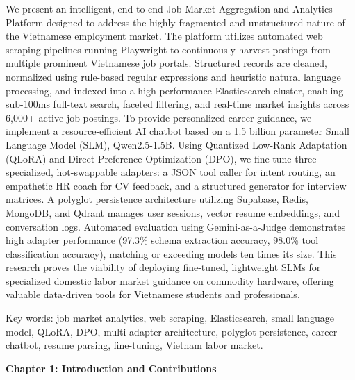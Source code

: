 \documentclass[12pt, a4paper]{report}
\begin{document}
\noindent We present an intelligent, end-to-end Job Market Aggregation and Analytics Platform designed to address the highly fragmented and unstructured nature of the Vietnamese employment market. The platform utilizes automated web scraping pipelines running Playwright to continuously harvest postings from multiple prominent Vietnamese job portals. Structured records are cleaned, normalized using rule-based regular expressions and heuristic natural language processing, and indexed into a high-performance Elasticsearch cluster, enabling sub-100ms full-text search, faceted filtering, and real-time market insights across 6,000+ active job postings. To provide personalized career guidance, we implement a resource-efficient AI chatbot based on a 1.5 billion parameter Small Language Model (SLM), Qwen2.5-1.5B. Using Quantized Low-Rank Adaptation (QLoRA) and Direct Preference Optimization (DPO), we fine-tune three specialized, hot-swappable adapters: a JSON tool caller for intent routing, an empathetic HR coach for CV feedback, and a structured generator for interview matrices. A polyglot persistence architecture utilizing Supabase, Redis, MongoDB, and Qdrant manages user sessions, vector resume embeddings, and conversation logs. Automated evaluation using Gemini-as-a-Judge demonstrates high adapter performance (97.3\% schema extraction accuracy, 98.0\% tool classification accuracy), matching or exceeding models ten times its size. This research proves the viability of deploying fine-tuned, lightweight SLMs for specialized domestic labor market guidance on commodity hardware, offering valuable data-driven tools for Vietnamese students and professionals.

\vspace{1cm}

\noindent Key words: job market analytics, web scraping, Elasticsearch, small language model, QLoRA, DPO, multi-adapter architecture, polyglot persistence, career chatbot, resume parsing, fine-tuning, Vietnam labor market.

\newpage
\begin{center}
    {\Huge \textbf{Chapter 1: Introduction and Contributions}\par}
\end{center}
\vspace{1cm}

\vspace{0.4cm}
\end{document}
